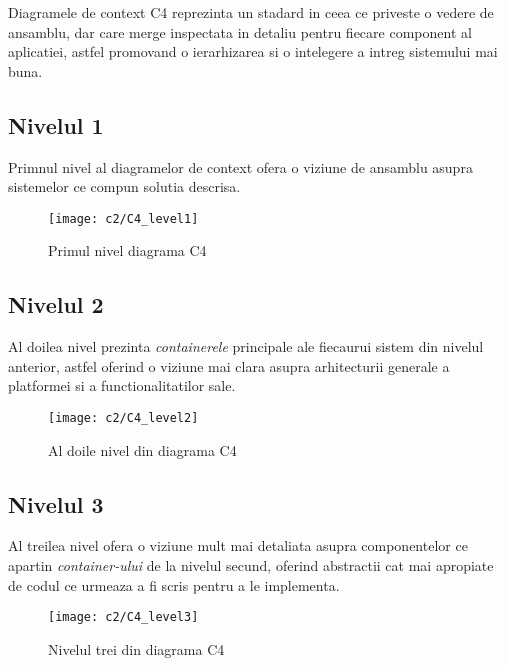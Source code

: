 Diagramele de context C4 reprezinta un stadard in ceea ce priveste o vedere de ansamblu, dar care merge inspectata in detaliu pentru fiecare component al aplicatiei, astfel promovand o ierarhizarea si o intelegere a intreg sistemului mai buna.\\


\subsection*{Nivelul 1}
Primnul nivel al diagramelor de context ofera o viziune de ansamblu asupra sistemelor ce compun solutia descrisa.
\vspace{1cm}
\begin{figure}[h]
	\centering
	
	\texttt{[image: c2/C4\_level1]}
	\caption{Primul nivel diagrama C4}
\end{figure}

\newpage
\subsection*{Nivelul 2}
Al doilea nivel prezinta \textit{containerele} principale ale fiecaurui sistem din nivelul anterior, astfel oferind o viziune mai clara asupra arhitecturii generale a platformei si a functionalitatilor sale.
\vspace{1cm}
\begin{figure}[h]
	\centering
	
	\texttt{[image: c2/C4\_level2]}
	\caption{Al doile nivel din diagrama C4}
\end{figure}

\subsection*{Nivelul 3}
Al treilea nivel ofera o viziune mult mai detaliata asupra componentelor ce apartin \textit{container-ului} de la nivelul secund, oferind abstractii cat mai apropiate de codul ce urmeaza a fi scris pentru a le implementa.

\vspace{1cm}
\begin{figure}[h]
	\centering
	
	\texttt{[image: c2/C4\_level3]}
	\caption{Nivelul trei din diagrama C4}
\end{figure}

